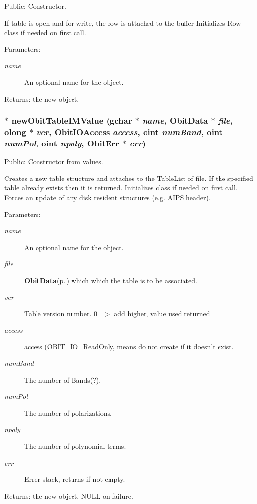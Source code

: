 Public: Constructor. 

If table is open and for write, the row is attached to the buffer Initializes Row class if needed on first call. \begin{Desc}
\item[Parameters:]
\begin{description}
\item[{\em name}]An optional name for the object. \end{description}
\end{Desc}
\begin{Desc}
\item[Returns:]the new object. \end{Desc}
\subsubsection{$\ast$ new\-Obit\-Table\-IMValue (gchar $\ast$ {\em name}, {\bf Obit\-Data} $\ast$ {\em file}, {\bf olong} $\ast$ {\em ver}, Obit\-IOAccess {\em access}, {\bf oint} {\em num\-Band}, {\bf oint} {\em num\-Pol}, {\bf oint} {\em npoly}, {\bf Obit\-Err} $\ast$ {\em err})}\label{ObitTableIM_8h_a12}


Public: Constructor from values. 

Creates a new table structure and attaches to the Table\-List of file. If the specified table already exists then it is returned. Initializes class if needed on first call. Forces an update of any disk resident structures (e.g. AIPS header). \begin{Desc}
\item[Parameters:]
\begin{description}
\item[{\em name}]An optional name for the object. \item[{\em file}]{\bf Obit\-Data}{\rm (p.\,\pageref{structObitData})} which which the table is to be associated. \item[{\em ver}]Table version number. 0=$>$ add higher, value used returned \item[{\em access}]access (OBIT\_\-IO\_\-Read\-Only, means do not create if it doesn't exist. \item[{\em num\-Band}]The number of Bands(?). \item[{\em num\-Pol}]The number of polarizations. \item[{\em npoly}]The number of polynomial terms. \item[{\em err}]Error stack, returns if not empty. \end{description}
\end{Desc}
\begin{Desc}
\item[Returns:]the new object, NULL on failure. \end{Desc}
